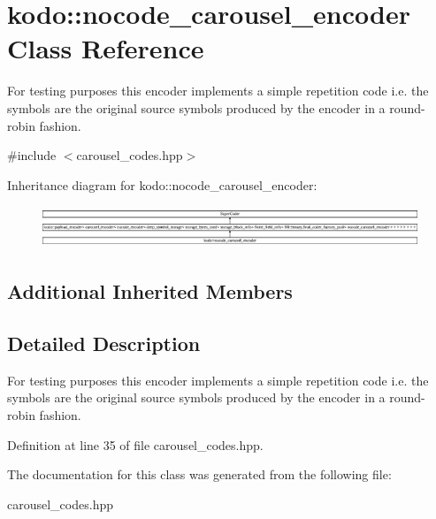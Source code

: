 \hypertarget{classkodo_1_1nocode__carousel__encoder}{\section{kodo\-:\-:nocode\-\_\-carousel\-\_\-encoder Class Reference}
\label{classkodo_1_1nocode__carousel__encoder}
}


For testing purposes this encoder implements a simple repetition code i.\-e. the symbols are the original source symbols produced by the encoder in a round-\/robin fashion.  




{\ttfamily \#include $<$carousel\-\_\-codes.\-hpp$>$}

Inheritance diagram for kodo\-:\-:nocode\-\_\-carousel\-\_\-encoder\-:\begin{figure}[H]
\begin{center}
\leavevmode
\includegraphics[height=1.266968cm]{classkodo_1_1nocode__carousel__encoder}
\end{center}
\end{figure}
\subsection*{Additional Inherited Members}


\subsection{Detailed Description}
For testing purposes this encoder implements a simple repetition code i.\-e. the symbols are the original source symbols produced by the encoder in a round-\/robin fashion. 

Definition at line 35 of file carousel\-\_\-codes.\-hpp.



The documentation for this class was generated from the following file\-:\begin{DoxyCompactItemize}
\item 
carousel\-\_\-codes.\-hpp\end{DoxyCompactItemize}
